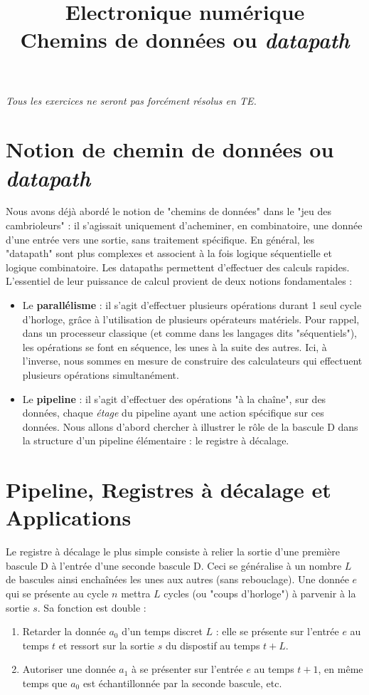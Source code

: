 \documentclass[a4paper,11pt]{article}
\title{{\Huge Electronique numérique}\\Chemins de données ou {\it datapath}}
\date{}
\begin{document}
\maketitle
{\it Tous les exercices ne seront pas forcément résolus en TE.}

\section{Notion de chemin de données ou {\it datapath}}

Nous avons déjà abordé le notion de "chemins de données"  dans le "jeu des cambrioleurs" : il s'agissait
uniquement d'acheminer, en combinatoire, une donnée d'une entrée vers une sortie, sans traitement spécifique. En général, les "datapath" sont plus complexes
et associent à la fois logique séquentielle et logique combinatoire. Les datapaths permettent d'effectuer des calculs rapides. L'essentiel de leur puissance
de calcul provient de deux notions fondamentales :
\begin{itemize}
  \item Le \textbf{parallélisme} : il s'agit d'effectuer plusieurs opérations durant 1 seul cycle d'horloge, grâce à l'utilisation de plusieurs opérateurs matériels.
  Pour rappel, dans un processeur classique (et comme dans les langages dits "séquentiels"), les opérations se font en séquence, les unes à la suite des autres. Ici, à l'inverse,
  nous sommes en mesure de construire des calculateurs qui effectuent plusieurs opérations simultanément.
  \item Le \textbf{pipeline} : il s'agit d'effectuer des opérations "à la chaîne", sur des données, chaque {\it étage} du pipeline ayant une action spécifique sur ces données.
  Nous allons d'abord chercher à illustrer le rôle de la bascule D dans la structure d'un pipeline élémentaire : le registre à décalage.
\end{itemize}


\section{Pipeline, Registres à décalage et Applications}
Le registre à décalage le plus simple consiste à relier la sortie d'une première bascule D à l'entrée d'une seconde bascule D.
Ceci se généralise à un nombre $L$ de bascules ainsi enchaînées les unes aux autres (sans rebouclage).
Une donnée $e$ qui se présente au cycle $n$ mettra $L$ cycles (ou "coups d'horloge") à parvenir à la sortie $s$.
Sa fonction est double :
\begin{enumerate}
  \item Retarder  la donnée $a_0$ d'un temps discret $L$ : elle se présente sur l'entrée $e$ au temps $t$ et ressort sur la sortie $s$ du dispostif au temps $t+L$.
  \item Autoriser une donnée $a_1$ à se présenter sur l'entrée $e$ au temps $t+1$, en même temps que $a_0$ est échantillonnée par la seconde bascule, etc.
\end{enumerate}
\end{document}
